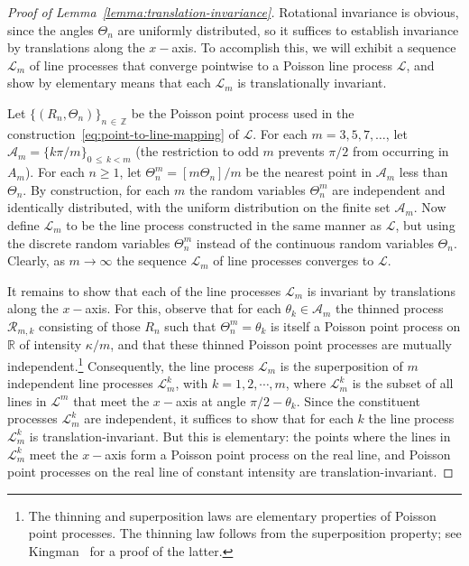\documentclass[AHL, Unicode, longabstracts, published]{cedram}
\newcommand{\zz}[1]{\mathbb #1}
\begin{document}
\begin{proof}[Proof of Lemma~\ref{lemma:translation-invariance}]
Rotational invariance is obvious, since the angles $\Theta_{n}$ are uniformly distributed, so it suffices to establish invariance by translations along the $x-$axis. To accomplish this, we will exhibit a sequence $\mathcal{L}_{m}$ of line processes that converge pointwise to a Poisson line process $\mathcal{L}$, and show by elementary means that each $\mathcal{L}_{m}$ is translationally invariant.

Let $\{(R_{n},\Theta_{n}) \}_{n\,\in\,\zz{Z}}$  be the Poisson point process used in the construction~\eqref{eq:point-to-line-mapping} of $\mathcal{L}$. For each $m=3,5,7,\dotsc$, let $\mathcal{A}_{m}=\{k\pi / m \}_{0\,\leq\,k<m}$ (the restriction to odd $m$ prevents $\pi /2$ from occurring in $A_{m}$). For each $n\geq 1$, let $\Theta^{m}_{n}=[m\Theta_{n}]/m$ be the nearest point in $\mathcal{A}_{m}$ less than $\Theta_{n}$. By construction, for each $m$ the random variables $\Theta^{m}_{n}$ are independent and identically distributed, with the uniform distribution on the finite set $\mathcal{A}_{m}$. Now define $\mathcal{L}_{m}$ to be the line process constructed in the same manner as $\mathcal{L}$, but using the discrete random variables $\Theta^{m}_{n}$ instead of the continuous random variables $\Theta_{n}$. Clearly, as $m \rightarrow \infty$ the sequence $\mathcal{L}_{m}$ of line processes converges to $\mathcal{L}$.

It remains to show that each of the line processes $\mathcal{L}_{m}$ is invariant by translations along the $x-$axis. For this, observe that for each $\theta_{k}\in \mathcal{A}_{m}$ the thinned process $\mathcal{R}_{m,k}$ consisting of those $R_{n}$ such that $\Theta^{m}_{n}=\theta_{k}$ is itself a Poisson point process on $\zz{R}$ of intensity $\kappa /m$, and that these thinned Poisson point processes are mutually independent.\footnote{The thinning and superposition laws are elementary properties of Poisson point processes. The thinning law follows from the superposition property; see Kingman~\cite{kingman} for a proof of the latter.} Consequently, the line process $\mathcal{L}_{m}$ is the superposition of $m$ independent line processes $\mathcal{L}^{k}_{m}$, with $k=1,2, \cdots,m$, where $\mathcal{L}^{k}_{m}$ is the subset of all lines in $\mathcal{L}^{m}$ that meet the $x-$axis at angle $\pi /2-\theta_{k}.$ Since the constituent processes $\mathcal{L}^{k}_{m}$ are independent, it suffices to show that for each $k$ the line process $\mathcal{L}^{k}_{m}$ is translation-invariant. But this is elementary: the points where the lines in $\mathcal{L}^{k}_{m}$ meet the $x-$axis form a Poisson point process on the real line, and Poisson point processes on the real line of constant intensity are translation-invariant.
\end{proof}
\end{document}
